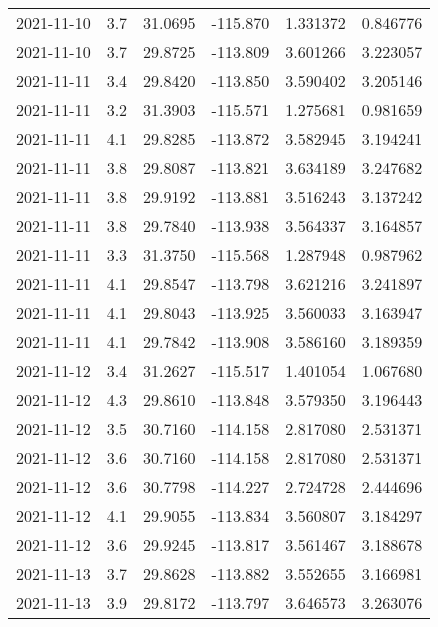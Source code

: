 \begin{tabular}{lrrrrr}
2021-11-10 &       3.7 &  31.0695 &  -115.870 &         1.331372 &         0.846776 \\
2021-11-10 &       3.7 &  29.8725 &  -113.809 &         3.601266 &         3.223057 \\
2021-11-11 &       3.4 &  29.8420 &  -113.850 &         3.590402 &         3.205146 \\
2021-11-11 &       3.2 &  31.3903 &  -115.571 &         1.275681 &         0.981659 \\
2021-11-11 &       4.1 &  29.8285 &  -113.872 &         3.582945 &         3.194241 \\
2021-11-11 &       3.8 &  29.8087 &  -113.821 &         3.634189 &         3.247682 \\
2021-11-11 &       3.8 &  29.9192 &  -113.881 &         3.516243 &         3.137242 \\
2021-11-11 &       3.8 &  29.7840 &  -113.938 &         3.564337 &         3.164857 \\
2021-11-11 &       3.3 &  31.3750 &  -115.568 &         1.287948 &         0.987962 \\
2021-11-11 &       4.1 &  29.8547 &  -113.798 &         3.621216 &         3.241897 \\
2021-11-11 &       4.1 &  29.8043 &  -113.925 &         3.560033 &         3.163947 \\
2021-11-11 &       4.1 &  29.7842 &  -113.908 &         3.586160 &         3.189359 \\
2021-11-12 &       3.4 &  31.2627 &  -115.517 &         1.401054 &         1.067680 \\
2021-11-12 &       4.3 &  29.8610 &  -113.848 &         3.579350 &         3.196443 \\
2021-11-12 &       3.5 &  30.7160 &  -114.158 &         2.817080 &         2.531371 \\
2021-11-12 &       3.6 &  30.7160 &  -114.158 &         2.817080 &         2.531371 \\
2021-11-12 &       3.6 &  30.7798 &  -114.227 &         2.724728 &         2.444696 \\
2021-11-12 &       4.1 &  29.9055 &  -113.834 &         3.560807 &         3.184297 \\
2021-11-12 &       3.6 &  29.9245 &  -113.817 &         3.561467 &         3.188678 \\
2021-11-13 &       3.7 &  29.8628 &  -113.882 &         3.552655 &         3.166981 \\
2021-11-13 &       3.9 &  29.8172 &  -113.797 &         3.646573 &         3.263076 \\

\end{tabular}
